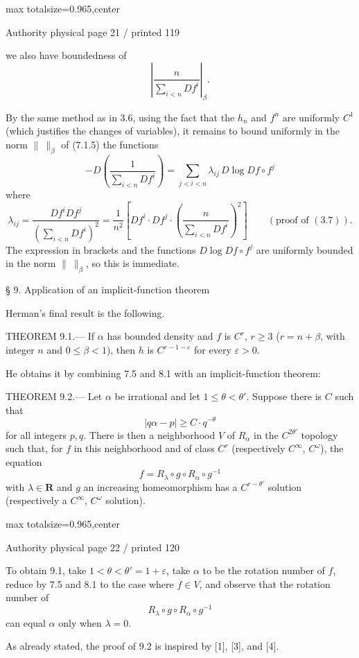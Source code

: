 \documentclass{article}
\begin{document}
\newpage
\noindent\begin{adjustbox}{max totalsize={\textwidth}{0.965\textheight},center}\begin{minipage}{\textwidth}
\noindent\hfill\scriptsize Authority physical page 21 / printed 119\par\normalsize
we also have boundedness of
\[
\left|\frac{n}{\sum_{i<n}Df^i}\right|_\beta.
\]

By the same method as in 3.6, using the fact that the \(h_n\) and \(f^n\) are uniformly \(C^1\) (which justifies the changes of variables), it remains to bound uniformly in the norm \(\lVert\ \rVert_\beta\) of (7.1.5) the functions
\[
-D\left(\frac1{\sum_{i<n}Df^i}\right)
=\sum_{j<i<n}\lambda_{ij}\,D\log Df\circ f^j
\]
where
\[
\lambda_{ij}
=\frac{Df^iDf^j}{\left(\sum_{i<n}Df^i\right)^2}
=\frac1{n^2}\left[Df^i\cdot Df^j\cdot
\left(\frac{n}{\sum_{i<n}Df^i}\right)^2\right]
\qquad(\text{proof of }(3.7)).
\]
The expression in brackets and the functions \(D\log Df\circ f^j\) are uniformly bounded in the norm \(\lVert\ \rVert_\beta\), so this is immediate.

§ 9. Application of an implicit-function theorem

Herman’s final result is the following.

THEOREM 9.1.— If \(\alpha\) has bounded density and \(f\) is \(C^r\), \(r\geq3\) (\(r=n+\beta\), with integer \(n\) and \(0\leq\beta<1\)), then \(h\) is \(C^{r-1-\varepsilon}\) for every \(\varepsilon>0\).

He obtains it by combining 7.5 and 8.1 with an implicit-function theorem:

THEOREM 9.2.— Let \(\alpha\) be irrational and let \(1\leq\theta<\theta'\). Suppose there is \(C\) such that
\[
|q\alpha-p|\geq C\cdot q^{-\theta}
\]
for all integers \(p,q\). There is then a neighborhood \(V\) of \(R_\alpha\) in the \(C^{2\theta'}\) topology such that, for \(f\) in this neighborhood and of class \(C^r\) (respectively \(C^\infty\), \(C^\omega\)), the equation
\[
f=R_\lambda\circ g\circ R_\alpha\circ g^{-1}
\]
with \(\lambda\in\mathbf R\) and \(g\) an increasing homeomorphism has a \(C^{r-\theta'}\) solution (respectively a \(C^\infty\), \(C^\omega\) solution).
\end{minipage}\end{adjustbox}

\newpage
\noindent\begin{adjustbox}{max totalsize={\textwidth}{0.965\textheight},center}\begin{minipage}{\textwidth}
\noindent\hfill\scriptsize Authority physical page 22 / printed 120\par\normalsize
To obtain 9.1, take \(1<\theta<\theta'=1+\varepsilon\), take \(\alpha\) to be the rotation number of \(f\), reduce by 7.5 and 8.1 to the case where \(f\in V\), and observe that the rotation number of
\[
R_\lambda\circ g\circ R_\alpha\circ g^{-1}
\]
can equal \(\alpha\) only when \(\lambda=0\).

As already stated, the proof of 9.2 is inspired by [1], [3], and [4].
\end{minipage}\end{adjustbox}
\end{document}
